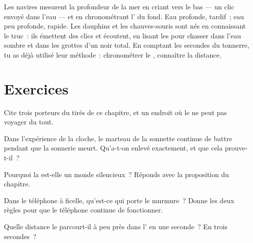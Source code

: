 \begin{remark}\label{rem:g4:how-sound-travels:sonar}
Les navires mesurent la profondeur de la mer en criant vers le bas
--- un clic envoyé dans l'eau --- et en chronométrant l' du fond.
Eau profonde,  tardif~; eau peu profonde,  rapide. Les
dauphins et les chauves-souris sont nés en connaissant le truc~: ils
émettent des clics et écoutent, en lisant les  pour chasser dans
l'eau sombre et dans les grottes d'un noir total. En comptant les
secondes du tonnerre, tu as déjà utilisé leur méthode~: chronométrer
le , connaître la distance.
\end{remark}

\section{Exercices}

\begin{exercise}[$\star$]\label{exo:g4:how-sound-travels:1}
Cite trois porteurs du  tirés de ce chapitre, et un endroit où le
 ne peut pas voyager du tout.
\end{exercise}

\begin{exercise}[$\star$]\label{exo:g4:how-sound-travels:2}
Dans l'expérience de la cloche, le marteau de la sonnette continue de
battre pendant que la sonnerie meurt. Qu'a-t-on enlevé exactement, et
que cela prouve-t-il~?
\end{exercise}

\begin{exercise}[$\star$]\label{exo:g4:how-sound-travels:3}
Pourquoi la  est-elle un monde silencieux~? Réponds avec la
proposition du chapitre.
\end{exercise}

\begin{exercise}[$\star$]\label{exo:g4:how-sound-travels:4}
Dans le téléphone à ficelle, qu'est-ce qui porte le murmure~? Donne
les deux règles pour que le téléphone continue de fonctionner.
\end{exercise}

\begin{exercise}[$\star$]\label{exo:g4:how-sound-travels:5}
Quelle distance le  parcourt-il à peu près dans l' en une
seconde~? En trois secondes~?
\end{exercise}

